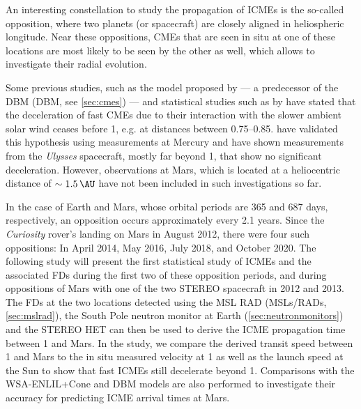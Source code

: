 An interesting constellation to study the propagation of \acp{ICME} is the so-called opposition, where two planets (or spacecraft) are closely aligned in heliospheric longitude. Near these oppositions, CMEs that are seen in situ at one of these locations are most likely to be seen by the other as well, which allows to investigate their radial evolution.

Some previous studies, such as the model proposed by \citet{Gopalswamy-2001} --- a predecessor of the \acl{DBM} (\acs{DBM}, see \autoref{sec:cmes}) --- and statistical studies such as by \citet{Winslow-2015} have stated that the deceleration of fast \acp{CME} due to their interaction with the slower ambient solar wind ceases before \SI{1}{\AU}, e.g. at distances between \SIrange[range-phrase={\,and\,}]{0.75}{0.85}{\AU}. \citet{Winslow-2015} have validated this hypothesis using measurements at Mercury and \citet{Wang-2005} have shown measurements from the \textit{Ulysses} spacecraft, mostly far beyond \SI{1}{\AU}, that show no significant deceleration. However, observations at Mars, which  is located at a heliocentric distance of $\sim\SI{1.5}{\AU}$ have not been included in such investigations so far.

In the case of Earth and Mars, whose orbital periods are 365 and 687 days, respectively, an opposition occurs approximately every 2.1 years. Since the \textit{Curiosity} rover's landing on Mars in August 2012, there were four such oppositions: In April 2014, May 2016, July 2018, and October 2020. The following study will present the first statistical study of \acp{ICME} and the associated \acp{FD} during the first two of these opposition periods, and during oppositions of Mars with one of the two \ac{STEREO} spacecraft in 2012 and 2013. The \acp{FD} at the two locations detected using the \acl{MSL} \acl{RAD} (\acp{MSL}/\acp{RAD}, \autoref{sec:mslrad}), the South Pole neutron monitor at Earth (\autoref{sec:neutronmonitors}) and the \ac{STEREO} \ac{HET} can then be used to derive the \ac{ICME} propagation time between \SI{1}{\AU} and Mars. In the study, we compare the derived transit speed between \SI{1}{\AU} and Mars to the in situ measured velocity at \SI{1}{\AU} as well as the launch speed at the Sun to show that fast \acp{ICME} still decelerate beyond \SI{1}{\AU}. Comparisons with the WSA-ENLIL+Cone and \ac{DBM} models are also performed to investigate their accuracy for predicting \ac{ICME} arrival times at Mars.




